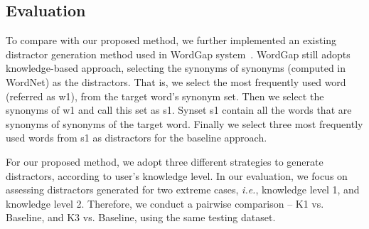 \subsection{Evaluation}
To compare with our proposed method, we further implemented an existing distractor generation method  used in WordGap system~\cite{Knoop2013}. WordGap still adopts knowledge-based approach, selecting the synonyms of synonyms (computed in WordNet) as the distractors. That is, we select the most frequently used word (referred as w1), from the target word’s synonym set. %
Then we select the synonyms of w1 and call this set as s1.
Synset s1 contain all the words that are synonyms of synonyms of the target word. Finally we select three most frequently used words from s1 as distractors for the baseline approach.

For our proposed method, we adopt three different strategies to generate distractors, according to user's knowledge level. In our evaluation, we focus on assessing distractors generated for two extreme cases, {\it i.e.}, knowledge level 1, and knowledge level 2. Therefore, we conduct a pairwise comparison -- K1  vs. Baseline, and K3  vs. Baseline, using the same testing dataset.



%



